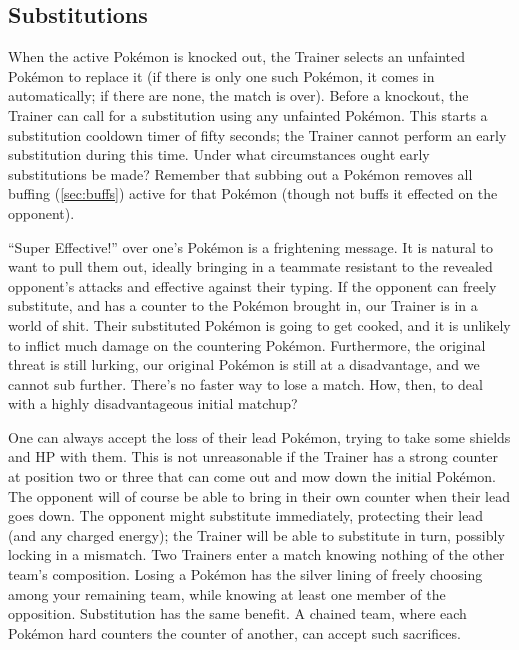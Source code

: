 \subsection{Substitutions\label{subsec:substitutions}}
When the active Pokémon is knocked out, the Trainer selects an unfainted
  Pokémon to replace it (if there is only one such Pokémon, it comes in
  automatically; if there are none, the match is over).
Before a knockout, the Trainer can call for a substitution using any
  unfainted Pokémon.
This starts a substitution cooldown timer of fifty seconds; the Trainer
  cannot perform an early substitution during this time.
Under what circumstances ought early substitutions be made?
Remember that subbing out a Pokémon removes all buffing (\autoref{sec:buffs})
  active for that Pokémon (though not buffs it effected on the opponent).

``Super Effective!'' over one's Pokémon is a frightening message.
It is natural to want to pull them out, ideally bringing in a teammate resistant
  to the revealed opponent's attacks and effective against their typing.
If the opponent can freely substitute, and has a counter to the Pokémon brought in,
  our Trainer is in a world of shit.
Their substituted Pokémon is going to get cooked, and it is unlikely to inflict much damage on the countering Pokémon.
Furthermore, the original threat is still lurking, our original Pokémon is still at a disadvantage,
 and we cannot sub further.
There's no faster way to lose a match.
How, then, to deal with a highly disadvantageous initial matchup?

One can always accept the loss of their lead Pokémon, trying to take some shields and HP with them.
This is not unreasonable if the Trainer has a strong counter at position two or three
  that can come out and mow down the initial Pokémon.
The opponent will of course be able to bring in their own counter when their lead goes down.
The opponent might substitute immediately, protecting their lead (and any charged energy); the Trainer will be able to substitute in turn, possibly locking in a mismatch.
Two Trainers enter a match knowing nothing of the other team's composition.
Losing a Pokémon has the silver lining of freely choosing among your remaining team,
  while knowing at least one member of the opposition.
Substitution has the same benefit.
A chained team, where each Pokémon hard counters the counter of another, can accept such sacrifices.

